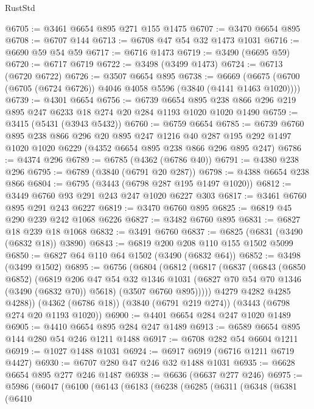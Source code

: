\begin{lexlean}{RustStd}
\begin{coremodule}
{\begin{coremodule}
{{{{{{{{{{{{{{{{{{{{{{{{{{@6705 := @3461 @6654 @895 @271 @155 @1475
@6707 := @3470 @6654 @895
@6708 := @6707 @144
@6713 := @6708 @47 @54 @32 @1473 @1031
@6716 := @6690 @59 @54 @59
@6717 := @6716 @1473
@6719 := @3490 (@6695 @59)
@6720 := @6717 @6719
@6722 := @3498 (@3499 @1473)
@6724 := @6713 (@6720 @6722)
@6726 := @3507 @6654 @895
@6738 := @6669 (@6675 (@6700 (@6705 (@6724 @6726)) @4046 @4058 @5596 (@3840 (@4141 @1463 @1020))))
@6739 := @4301 @6654
@6756 := @6739
    @6654
    @895
    @238
    @866
    @296
    @219
    @895
    @247
    @6233
    @18
    @274
    @20
    @284
    @1193
    @1020
    @1020
    @1490
@6759 := @3415 (@5431 (@3943 @5432))
@6760 := @6759 @6654
@6785 := @6739
    @6760
    @895
    @238
    @866
    @296
    @20
    @895
    @247
    @1216
    @40
    @287
    @195
    @292
    @1497
    @1020
    @1020
    @6229
    (@4352 @6654 @895 @238 @866 @296 @895 @247)
@6786 := @4374 @296
@6789 := @6785 (@4362 (@6786 @40))
@6791 := @4380 @238 @296
@6795 := @6789 (@3840 (@6791 @20 @287))
@6798 := @4388 @6654 @238 @866
@6804 := @6795 (@3443 (@6798 @287 @195 @1497 @1020))
@6812 := @3449 @6760 @93 @291 @243 @247 @1020 @6227 @303
@6817 := @3461 @6760 @895 @291 @243 @6227
@6819 := @3470 @6760 @895
@6825 := @6819 @45 @290 @239 @242 @1068 @6226
@6827 := @3482 @6760 @895
@6831 := @6827 @18 @239 @18 @1068
@6832 := @3491 @6760
@6837 := @6825 (@6831 (@3490 (@6832 @18)) @3890)
@6843 := @6819 @200 @208 @110 @155 @1502 @5099
@6850 := @6827 @64 @110 @64 @1502 (@3490 (@6832 @64))
@6852 := @3498 (@3499 @1502)
@6895 := @6756
    (@6804
      (@6812
        (@6817
          (@6837
            (@6843
              (@6850 @6852)
              (@6819
                @206
                @47
                @54
                @32
                @1346
                @1031
                (@6827 @70 @54 @70 @1346 (@3490 (@6832 @70)) @5618)
                (@3507 @6760 @895)))))
        @4279
        @4282
        @4285
        @4288))
    (@4362 (@6786 @18))
    (@3840 (@6791 @219 @274))
    (@3443 (@6798 @274 @20 @1193 @1020))
@6900 := @4401 @6654 @284 @247 @1020 @1489
@6905 := @4410 @6654 @895 @284 @247 @1489
@6913 := @6589 @6654 @895 @144 @280 @54 @246 @1211 @1488
@6917 := @6708 @282 @54 @6604 @1211
@6919 := @1027 @1488 @1031
@6924 := @6917 @6919 (@6716 @1211 @6719 @4427)
@6930 := @6707 @280 @47 @246 @32 @1488 @1031
@6935 := @6628 @6654 @895 @277 @246 @1487
@6938 := @6636 (@6637 @277 @246)
@6975 := @5986
    (@6047
      (@6100
        (@6143
          (@6183
            (@6238
              (@6285
                (@6311
                  (@6348
                    (@6381
                      (@6410
}}}}}}}}}}}}}}}}}}}}}}}}}}
\end{coremodule}}
\end{coremodule}
\end{lexlean}

